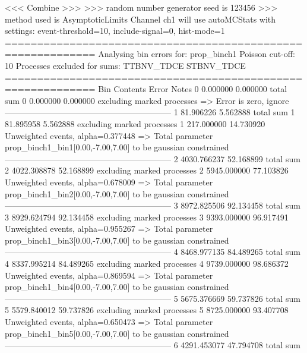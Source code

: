  <<< Combine >>> 
>>> random number generator seed is 123456
>>> method used is AsymptoticLimits
Channel ch1 will use autoMCStats with settings: event-threshold=10, include-signal=0, hist-mode=1
============================================================
Analysing bin errors for: prop_binch1
Poisson cut-off: 10
Processes excluded for sums: TTBNV_TDCE STBNV_TDCE
============================================================
Bin        Contents        Error           Notes                         
0          0.000000        0.000000        total sum                     
0          0.000000        0.000000        excluding marked processes    
  => Error is zero, ignore      
------------------------------------------------------------
1          81.906226       5.562888        total sum                     
1          81.895958       5.562888        excluding marked processes    
1          217.000000      14.730920       Unweighted events, alpha=0.377448
  => Total parameter prop_binch1_bin1[0.00,-7.00,7.00] to be gaussian constrained
------------------------------------------------------------
2          4030.766237     52.168899       total sum                     
2          4022.308878     52.168899       excluding marked processes    
2          5945.000000     77.103826       Unweighted events, alpha=0.678009
  => Total parameter prop_binch1_bin2[0.00,-7.00,7.00] to be gaussian constrained
------------------------------------------------------------
3          8972.825506     92.134458       total sum                     
3          8929.624794     92.134458       excluding marked processes    
3          9393.000000     96.917491       Unweighted events, alpha=0.955267
  => Total parameter prop_binch1_bin3[0.00,-7.00,7.00] to be gaussian constrained
------------------------------------------------------------
4          8468.977135     84.489265       total sum                     
4          8337.995214     84.489265       excluding marked processes    
4          9739.000000     98.686372       Unweighted events, alpha=0.869594
  => Total parameter prop_binch1_bin4[0.00,-7.00,7.00] to be gaussian constrained
------------------------------------------------------------
5          5675.376669     59.737826       total sum                     
5          5579.840012     59.737826       excluding marked processes    
5          8725.000000     93.407708       Unweighted events, alpha=0.650473
  => Total parameter prop_binch1_bin5[0.00,-7.00,7.00] to be gaussian constrained
------------------------------------------------------------
6          4291.453077     47.794708       total sum                     

